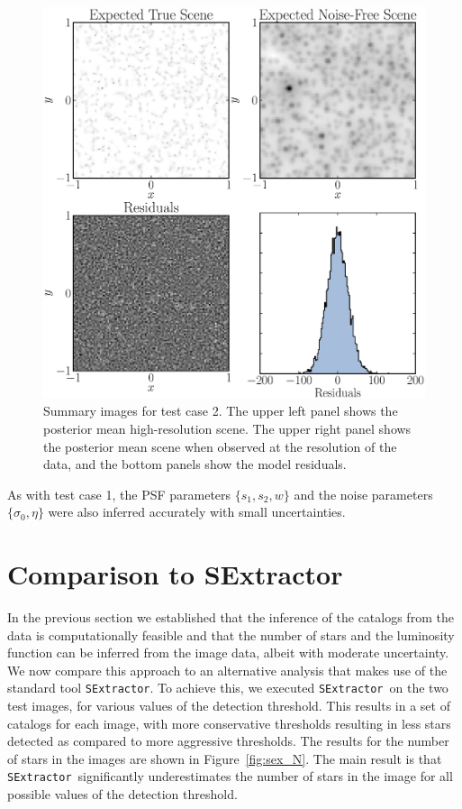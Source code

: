 \documentclass[manuscript]{aastex}
\newcommand{\sex}{{\tt SExtractor}}
\begin{document}
\begin{figure}
\begin{center}
\includegraphics[width=\textwidth]{Figures/summaries.eps}
\end{center}
\caption{Summary images for test case 2. The upper left panel shows the posterior
mean high-resolution scene. The upper right panel shows the posterior mean scene
when observed at the resolution of the data, and the bottom panels show the
model residuals.
\label{fig:summaries}}
\end{figure}

As with test case 1, the PSF parameters $\{s_1, s_2, w\}$ and the noise parameters $\{\sigma_0, \eta\}$
were also inferred accurately with small uncertainties.

\section{Comparison to SExtractor}\label{sec:sex}
In the previous section we established that the inference of the catalogs from
the data is computationally feasible and that the number of stars and the
luminosity function can be inferred from the image data, albeit with moderate
uncertainty. We now compare this approach to an alternative analysis that makes
use of the standard
tool \sex. To achieve this, we executed \sex~on the two test images, for various
values of the detection threshold. This results in a set of catalogs
for each image, with more conservative thresholds resulting in less stars detected
as compared to more aggressive thresholds. The results for the number of stars in
the images are shown in Figure~\ref{fig:sex_N}. The main result is that
\sex~significantly underestimates the number of stars in the image for all
possible values of the detection threshold.
\end{document}
